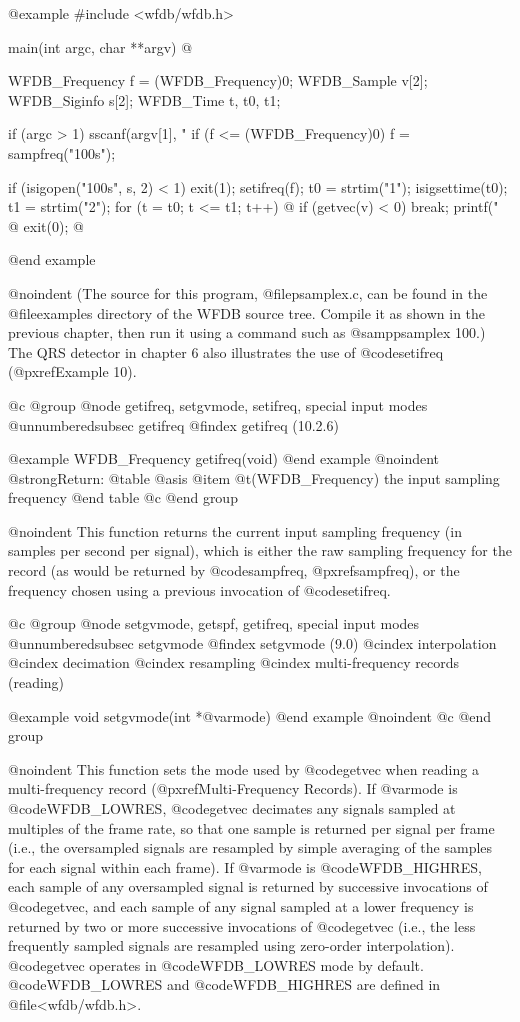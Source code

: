 {{{{{{{{{@example
#include <wfdb/wfdb.h>

main(int argc, char **argv)
@{
    WFDB_Frequency f = (WFDB_Frequency)0;
    WFDB_Sample v[2];
    WFDB_Siginfo s[2];
    WFDB_Time t, t0, t1;

    if (argc > 1) sscanf(argv[1], "%
    if (f <= (WFDB_Frequency)0) f = sampfreq("100s");

    if (isigopen("100s", s, 2) < 1)
        exit(1);
    setifreq(f);
    t0 = strtim("1");
    isigsettime(t0);
    t1 = strtim("2");
    for (t = t0; t <= t1; t++) @{
        if (getvec(v) < 0)
            break;
        printf("%
    @}
    exit(0);
@}
@end example

@noindent
(The source for this program, @file{psamplex.c}, can be found in the
@file{examples} directory of the WFDB source tree.  Compile it as shown
in the previous chapter, then run it using a command such as
@samp{psamplex 100}.)  The QRS detector in chapter 6 also illustrates
the use of @code{setifreq} (@pxref{Example 10}).

@c @group
@node     getifreq, setgvmode, setifreq, special input modes
@unnumberedsubsec getifreq
@findex getifreq (10.2.6)

@example
WFDB_Frequency getifreq(void)
@end example
@noindent
@strong{Return:}
@table @asis
@item @t{(WFDB_Frequency)}
the input sampling frequency
@end table
@c @end group

@noindent
This function returns the current input sampling frequency (in samples
per second per signal), which is either the raw sampling frequency for
the record (as would be returned by @code{sampfreq}, @pxref{sampfreq}),
or the frequency chosen using a previous invocation of @code{setifreq}.

@c @group
@node     setgvmode, getspf, getifreq, special input modes
@unnumberedsubsec setgvmode
@findex setgvmode (9.0)
@cindex interpolation
@cindex decimation
@cindex resampling
@cindex multi-frequency records (reading)

@example
void setgvmode(int *@var{mode})
@end example
@noindent
@c @end group

@noindent
This function sets the mode used by @code{getvec} when reading a
multi-frequency record (@pxref{Multi-Frequency Records}).  If @var{mode} is
@code{WFDB_LOWRES}, @code{getvec} decimates any signals sampled at multiples of
the frame rate, so that one sample is returned per signal per frame (i.e., the
oversampled signals are resampled by simple averaging of the samples for each
signal within each frame).  If @var{mode} is @code{WFDB_HIGHRES}, each sample
of any oversampled signal is returned by successive invocations of
@code{getvec}, and each sample of any signal sampled at a lower frequency is
returned by two or more successive invocations of @code{getvec} (i.e., the less
frequently sampled signals are resampled using zero-order interpolation).
@code{getvec} operates in @code{WFDB_LOWRES} mode by default.
@code{WFDB_LOWRES} and @code{WFDB_HIGHRES} are defined in @file{<wfdb/wfdb.h>}.

}}}}}}}}}
